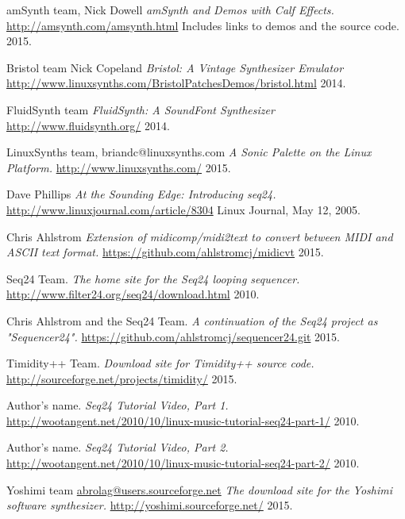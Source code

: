 \begin{thebibliography}{99}

   amSynth team, Nick Dowell
   \emph{amSynth and Demos with Calf Effects.}
   \url{http://amsynth.com/amsynth.html}
   Includes links to demos and the source code.
   2015.

   Bristol team Nick Copeland
   \emph{Bristol: A Vintage Synthesizer Emulator}
   \url{http://www.linuxsynths.com/BristolPatchesDemos/bristol.html}
   2014.

   FluidSynth team
   \emph{FluidSynth: A SoundFont Synthesizer}
   \url{http://www.fluidsynth.org/}
   2014.

   LinuxSynths team, briandc@linuxsynths.com
   \emph{A Sonic Palette on the Linux Platform.}
   \url{http://www.linuxsynths.com/}
   2015.

   Dave Phillips
   \emph{At the Sounding Edge: Introducing seq24.}
   \url{http://www.linuxjournal.com/article/8304}
   Linux Journal, May 12, 2005.

   Chris Ahlstrom
   \emph{Extension of midicomp/midi2text to convert between MIDI and ASCII text format.}
   \url{https://github.com/ahlstromcj/midicvt}
   2015.

   Seq24 Team.
   \emph{The home site for the Seq24 looping sequencer.}
   \url{http://www.filter24.org/seq24/download.html}
   2010.

   Chris Ahlstrom and the Seq24 Team.
   \emph{A continuation of the Seq24 project as "Sequencer24".}
   \url{https://github.com/ahlstromcj/sequencer24.git}
   2015.

   Timidity++ Team.
   \emph{Download site for Timidity++ source code.}
   \url{http://sourceforge.net/projects/timidity/}
   2015.

   Author's name.
   \emph{Seq24 Tutorial Video, Part 1.}
   \url{http://wootangent.net/2010/10/linux-music-tutorial-seq24-part-1/}
   2010.

   Author's name.
   \emph{Seq24 Tutorial Video, Part 2.}
   \url{http://wootangent.net/2010/10/linux-music-tutorial-seq24-part-2/}
   2010.

   Yoshimi team \url{abrolag@users.sourceforge.net}
   \emph{The download site for the Yoshimi software synthesizer.}
   \url{http://yoshimi.sourceforge.net/}
   2015.


\end{thebibliography}
